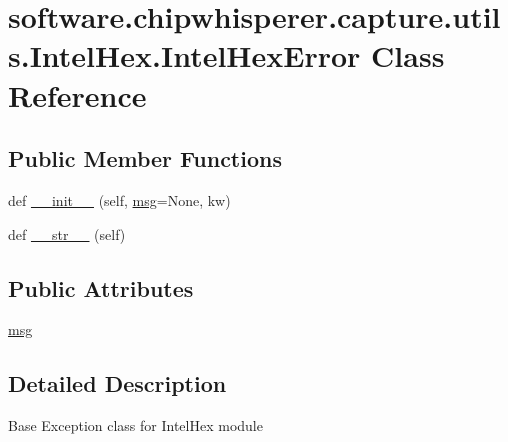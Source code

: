 \hypertarget{classsoftware_1_1chipwhisperer_1_1capture_1_1utils_1_1IntelHex_1_1IntelHexError}{}\section{software.\+chipwhisperer.\+capture.\+utils.\+Intel\+Hex.\+Intel\+Hex\+Error Class Reference}
\label{classsoftware_1_1chipwhisperer_1_1capture_1_1utils_1_1IntelHex_1_1IntelHexError}
\subsection*{Public Member Functions}
\begin{DoxyCompactItemize}
\item 
def \hyperlink{classsoftware_1_1chipwhisperer_1_1capture_1_1utils_1_1IntelHex_1_1IntelHexError_aaf5a9eb326933bdfa3545c9b3db84d3b}{\+\_\+\+\_\+init\+\_\+\+\_\+} (self, \hyperlink{classsoftware_1_1chipwhisperer_1_1capture_1_1utils_1_1IntelHex_1_1IntelHexError_a2739ad20fcbaaf748aa001eea62793f3}{msg}=None, kw)
\item 
def \hyperlink{classsoftware_1_1chipwhisperer_1_1capture_1_1utils_1_1IntelHex_1_1IntelHexError_a79467170034da486c671dfa53a19f1a0}{\+\_\+\+\_\+str\+\_\+\+\_\+} (self)
\end{DoxyCompactItemize}
\subsection*{Public Attributes}
\begin{DoxyCompactItemize}
\item 
\hyperlink{classsoftware_1_1chipwhisperer_1_1capture_1_1utils_1_1IntelHex_1_1IntelHexError_a2739ad20fcbaaf748aa001eea62793f3}{msg}
\end{DoxyCompactItemize}


\subsection{Detailed Description}
\begin{DoxyVerb}Base Exception class for IntelHex module\end{DoxyVerb}
 

